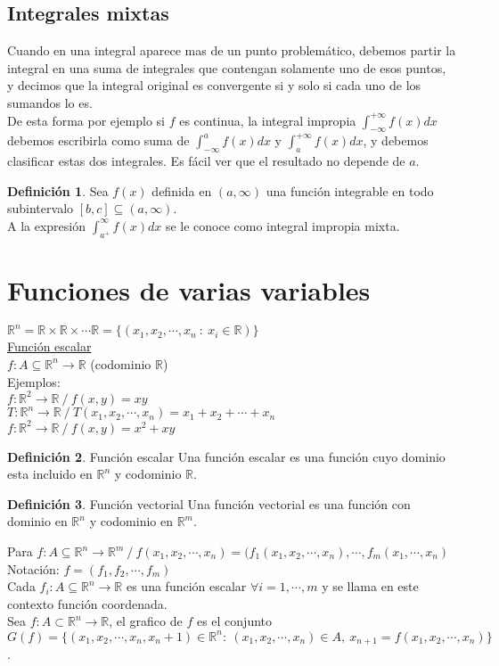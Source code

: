 \documentclass[10pt]{article}
\theoremstyle{definition}
\newtheorem{definition}{Definición}[section]
\begin{document}
\subsection{Integrales mixtas}
Cuando en una integral aparece mas de un punto problemático, debemos partir la integral en una suma de integrales que contengan solamente uno de esos puntos, y decimos que la integral original es convergente si y solo si cada uno de los sumandos lo es.\\
De esta forma por ejemplo si $f$ es continua, la integral impropia $\int_{-\infty}^{+\infty} f(x) dx$ debemos escribirla como suma de $\int_{-\infty}^{a} f(x) dx$ y $\int_{a}^{+\infty} f(x) dx$, y debemos clasificar estas dos integrales. Es fácil ver que el resultado no depende de $a$.
\begin{definition}
    Sea $f(x)$ definida en $(a,\infty)$ una función integrable en todo subintervalo $[b,c]\subseteq (a,\infty)$.
    \\A la expresión $\int_{a^+}^{\infty} f(x) dx$ se le conoce como integral impropia mixta.
\end{definition}
\newpage\section{Funciones de varias variables}
$\mathbb{R}^n=\mathbb{R}\times\mathbb{R}\times\cdots\mathbb{R}=\{\left( x_1,x_2,\cdots,x_n\ :\ x_i \in\mathbb{R} \right) \}$
\\\underline{Función escalar}
\\$f:A\subseteq\mathbb{R}^n\to\mathbb{R}$ (codominio $\mathbb{R}$)
	\\Ejemplos:
	\\$f:\mathbb{R}^2\to\mathbb{R}\ /\ f(x,y)=xy$
\\$T:\mathbb{R}^n\to\mathbb{R}\ /\ T(x_1,x_2,\cdots,x_n)=x_1+x_2+\cdots+x_n$
	\\$f:\mathbb{R}^2\to\mathbb{R}\ /\ f(x,y)=x^2+xy$
\begin{definition}{Función escalar}
	Una función escalar es una función cuyo dominio esta incluido en $\mathbb{R}^n$ y codominio $\mathbb{R}$.
\end{definition}
\begin{definition}{Función vectorial}
	Una función vectorial es una función con dominio en $\mathbb{R}^n$ y codominio en $\mathbb{R}^m$.
\end{definition}
Para $f:A\subseteq\mathbb{R}^n\to\mathbb{R}^m\ /\ f(x_1,x_2,\cdots,x_n)=(f_1(x_1,x_2,\cdots,x_n),\cdots,f_m(x_1,\cdots,x_n)$
\\Notación: $f=(f_1,f_2,\cdots,f_m)$
\\Cada $f_i:A\subseteq\mathbb{R}^n\to\mathbb{R}$ es una función escalar $\forall i=1,\cdots,m$ y se llama en este contexto función coordenada.
\\Sea $f:A\subset\mathbb{R}^n\to\mathbb{R}$, el grafico de $f$ es el conjunto $G(f)=\{(x_1,x_2,\cdots,x_n,x_n+1)\in\mathbb{R}^n:\ (x_1,x_2,\cdots,x_n)\in A,\ x_{n+1}=f(x_1,x_2,\cdots,x_n)\}$.
\end{document}
